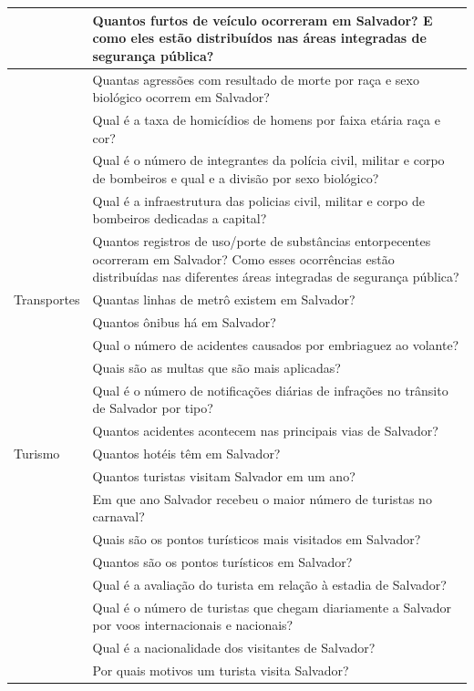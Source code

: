 \documentclass[
]{book}
\begin{document}
\begin{table}
\begin{tabular}[t]{l|l}
\hline
 & Quantos furtos de veículo ocorreram em Salvador? E como eles estão distribuídos nas áreas integradas de segurança pública?\\
\hline
 & Quantas agressões com resultado de morte por raça e sexo biológico ocorrem em Salvador?\\
\hline
 & Qual é a taxa de homicídios de homens por faixa etária raça e cor?\\
\hline
 & Qual é o número de integrantes da polícia civil, militar e corpo de bombeiros e qual e a divisão por sexo biológico?\\
\hline
 & Qual é a infraestrutura das policias civil, militar e corpo de bombeiros dedicadas a capital?\\
\hline
 & Quantos registros de uso/porte de substâncias entorpecentes ocorreram em Salvador? Como esses ocorrências estão distribuídas nas diferentes áreas integradas de segurança pública?\\
\hline
Transportes & Quantas linhas de metrô existem em Salvador?\\
\hline
 & Quantos ônibus há em Salvador?\\
\hline
 & Qual o número de acidentes causados por embriaguez ao volante?\\
\hline
 & Quais são as multas que são mais aplicadas?\\
\hline
 & Qual é o número de notificações diárias de infrações no trânsito de Salvador por tipo?\\
\hline
 & Quantos acidentes acontecem nas principais vias de Salvador?\\
\hline
Turismo & Quantos hotéis têm em Salvador?\\
\hline
 & Quantos turistas visitam Salvador em um ano?\\
\hline
 & Em que ano Salvador recebeu o maior número de turistas no carnaval?\\
\hline
 & Quais são os pontos turísticos mais visitados em Salvador?\\
\hline
 & Quantos são os pontos turísticos em Salvador?\\
\hline
 & Qual é a avaliação do turista em relação à estadia de Salvador?\\
\hline
 & Qual é o número de turistas que chegam diariamente a Salvador por voos internacionais e nacionais?\\
\hline
 & Qual é a nacionalidade dos visitantes de Salvador?\\
\hline
 & Por quais motivos um turista visita Salvador?\\
\hline
\end{tabular}
\end{table}

  
\end{document}
